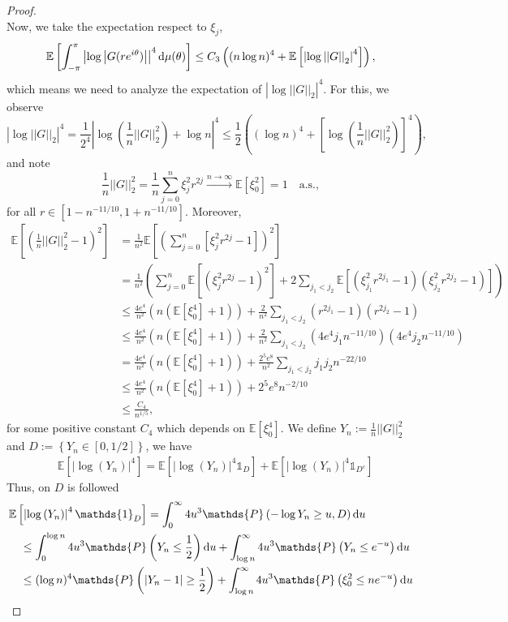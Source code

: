 \documentclass[12pt]{amsart}
\theoremstyle{plain}
\numberwithin{equation}{section}
\renewcommand{\Pr}{\mathbb{P}}
\newcommand{\<}{\langle}
\renewcommand{\>}{\rangle}
\newcommand{\PP}[1]{\left(#1\right)}
\newcommand{\CC}[1]{\left[#1\right]}
\newcommand{\LL}[1]{\left\{#1\right\}}
\newcommand{\dd}{\textnormal{d}}
\newcommand{\E}[2][ ]{\mathbb{E}{#1}\left[#2\right]}
\newcommand{\abs}[1]{\left|#1\right|}
\newcommand{\norm}[1]{\left|\left|#1\right|\right|}
\renewcommand{\Pr}[1]{\mathds{P}\left(#1\right)}
\begin{document}
\begin{proof}
\[\]
Now, we take the expectation respect to $\xi_j$,
\[
\E{  \int_{-\pi}^{\pi} \abs{\log\abs{G(re^{i\theta})}}^4 \dd\mu(\theta) } \leq C_3 \PP{ (n\log n)^4 + \E{\abs{\log\norm{G}_2}^4} },
\]
which means we need to analyze the expectation of $\abs{\log\norm{G}_2}^4$. For this, we observe 
\[
\abs{\log\norm{G}_2}^4  = \frac{1}{2^4} \abs{ \log\PP{\frac{1}{n}\norm{G}_2^2} + \log n}^4 \leq \frac{1}{2}\PP{(\log n)^4 + \CC{\log\PP{\frac{1}{n}\norm{G}_2^2}}^4 },
\]
and note 
\[
\frac{1}{n}\norm{G}_2^2 = \frac{1}{n} \sum_{j=0}^n \xi_j^2 r^{2j} \stackrel{n\to\infty}{\longrightarrow} \E{\xi_0^2}=1 \quad\mbox{a.s.},
\]
for all $r\in[1-n^{-11/10}, 1+n^{-11/10}]$. Moreover,
\begin{align*}
\E{\PP{\frac{1}{n}\norm{G}_2^2 - 1}^2} & = \frac{1}{n^2}\E{ \PP{\sum_{j=0}^n \CC{\xi_j^2 r^{2j} - 1}}^2} \\
& = \frac{1}{n^2}\PP{\sum_{j=0}^n \E{(\xi^2_j r^{2j} - 1)^2}  + 2\sum_{j_1<j_2} \E{(\xi_{j_1}^2 r^{2j_1} - 1)(\xi_{j_2}^2 r^{2j_2} - 1)} } \\
& \leq \frac{4e^4}{n^2}\PP{ n(\E{\xi_0^4}+1) } + \frac{2}{n^2}\sum_{j_1<j_2} (r^{2j_1}-1)(r^{2j_2}-1) \\
& \leq \frac{4e^4}{n^2}\PP{ n(\E{\xi_0^4}+1) } + \frac{2}{n^2}\sum_{j_1<j_2} (4e^4 j_1 n^{-11/10})(4e^4 j_2 n^{-11/10}) \\
& = \frac{4e^4}{n^2}\PP{ n(\E{\xi_0^4}+1) } + \frac{2^5 e^8}{n^2}\sum_{j_1<j_2}  j_1j_2 n^{-22/10} \\
& \leq \frac{4e^4}{n^2}\PP{ n(\E{\xi_0^4}+1) } + {2^5 e^8} n^{-2/10} \\
& \leq \frac{C_4}{n^{1/5}}, 
\end{align*}
for some positive constant $C_4$ which depends on $\E{\xi_0^4}$. 
We define $Y_n:=\frac{1}{n}\norm{G}_2^2$ and $D:=\LL{Y_n\in[0,1/2]}$, we have
\begin{align*}
& \E{ \abs{\log\PP{Y_n}}^4 } = \E{ \abs{\log\PP{Y_n}}^4 \mathds{1}_{D}} + \E{ \abs{\log\PP{Y_n}}^4 \mathds{1}_{D^c}}
\end{align*}
Thus, on $D$ is followed
\begin{align*}
& \E{ \abs{\log\PP{Y_n}}^4 \mathds{1}_{D}}  = \int_{0}^{\infty} 4u^3 \Pr{-\log Y_n \geq u, D} \dd u \\
& \quad \leq  \int_{0}^{\log n} 4u^3 \Pr{Y_n \leq \frac{1}{2} } \dd u + \int_{\log n}^{\infty} 4u^3 \Pr{Y_n \leq e^{-u}} \dd u \\
& \quad \leq (\log n)^4 \Pr{\abs{Y_n-1}\geq \frac{1}{2}} + \int_{\log n}^{\infty} 4u^3 \Pr{\xi_0^2 \leq n e^{-u}} \dd u \\

\end{align*}
\end{proof}
\end{document}
